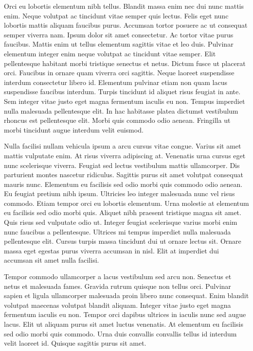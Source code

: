 \documentclass[11pt,a4paper]{article}
\begin{document}
Orci eu lobortis elementum nibh tellus. Blandit massa enim nec dui nunc mattis enim. Neque volutpat ac tincidunt vitae semper quis lectus. Felis eget nunc lobortis mattis aliquam faucibus purus. Accumsan tortor posuere ac ut consequat semper viverra nam. Ipsum dolor sit amet consectetur. Ac tortor vitae purus faucibus. Mattis enim ut tellus elementum sagittis vitae et leo duis. Pulvinar elementum integer enim neque volutpat ac tincidunt vitae semper. Elit pellentesque habitant morbi tristique senectus et netus. Dictum fusce ut placerat orci. Faucibus in ornare quam viverra orci sagittis. Neque laoreet suspendisse interdum consectetur libero id. Elementum pulvinar etiam non quam lacus suspendisse faucibus interdum. Turpis tincidunt id aliquet risus feugiat in ante. Sem integer vitae justo eget magna fermentum iaculis eu non. Tempus imperdiet nulla malesuada pellentesque elit. In hac habitasse platea dictumst vestibulum rhoncus est pellentesque elit. Morbi quis commodo odio aenean. Fringilla ut morbi tincidunt augue interdum velit euismod.

Nulla facilisi nullam vehicula ipsum a arcu cursus vitae congue. Varius sit amet mattis vulputate enim. At risus viverra adipiscing at. Venenatis urna cursus eget nunc scelerisque viverra. Feugiat sed lectus vestibulum mattis ullamcorper. Dis parturient montes nascetur ridiculus. Sagittis purus sit amet volutpat consequat mauris nunc. Elementum eu facilisis sed odio morbi quis commodo odio aenean. Eu feugiat pretium nibh ipsum. Ultricies leo integer malesuada nunc vel risus commodo. Etiam tempor orci eu lobortis elementum. Urna molestie at elementum eu facilisis sed odio morbi quis. Aliquet nibh praesent tristique magna sit amet. Quis risus sed vulputate odio ut. Integer feugiat scelerisque varius morbi enim nunc faucibus a pellentesque. Ultrices mi tempus imperdiet nulla malesuada pellentesque elit. Cursus turpis massa tincidunt dui ut ornare lectus sit. Ornare massa eget egestas purus viverra accumsan in nisl. Elit at imperdiet dui accumsan sit amet nulla facilisi.

Tempor commodo ullamcorper a lacus vestibulum sed arcu non. Senectus et netus et malesuada fames. Gravida rutrum quisque non tellus orci. Pulvinar sapien et ligula ullamcorper malesuada proin libero nunc consequat. Enim blandit volutpat maecenas volutpat blandit aliquam. Integer vitae justo eget magna fermentum iaculis eu non. Tempor orci dapibus ultrices in iaculis nunc sed augue lacus. Elit ut aliquam purus sit amet luctus venenatis. At elementum eu facilisis sed odio morbi quis commodo. Urna duis convallis convallis tellus id interdum velit laoreet id. Quisque sagittis purus sit amet.
\end{document}
